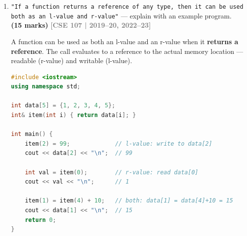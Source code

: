 \documentclass[12pt,a3paper]{article}
\newcommand{\yr}[1]{\hfill\textcolor{gray}{\small\textbf{[#1]}}}
\newcommand{\mk}[1]{\textcolor{orange!70!black}{\small\textbf{(#1 marks)}}}
\begin{document}
\begin{enumerate}
\begin{tcolorbox}
\begin{lstlisting}[language=C++]
#include <iostream>
using namespace std;

void space(char ch)            { cout << ch << "\n"; }
void space(char ch, int count) {
    for (int i = 0; i < count; i++) cout << ch;
    cout << "\n";
}

int main() {
    void (*fp1)(char)      = space;  // first version
    void (*fp2)(char, int) = space;  // second version

    fp1('*');      // *
    fp2('-', 5);   // -----
    return 0;
}
\end{lstlisting}

\textbf{Problem if second declared as
\texttt{void space(char ch, int count = 0)}:}

Both \texttt{space(char)} and \texttt{space(char, int=0)} match a
one-argument call.  When the compiler tries to resolve
\texttt{fp1 = space}, it finds two equally valid matches and reports
an \textbf{ambiguity error}.

\end{tcolorbox}


\item \texttt{"If a function returns a reference of any type, then it can be used both as an l-value and r-value"} --- explain with an example program. \mk{15}
\yr{CSE 107 | 2019--20, 2022--23}

\begin{tcolorbox}[enhanced,breakable,ansbox,colback=cC!4,colframe=cC,
  boxrule=0.8pt,arc=5pt,
  title={\textbf{Answer --- Function as l-value and r-value}},
  fonttitle=\bfseries\color{white},colbacktitle=cC]

A function can be used as both an l-value and an r-value when it
\textbf{returns a reference}.  The call evaluates to a reference to
the actual memory location --- readable (r-value) and writable
(l-value).

\begin{lstlisting}[language=C++]
#include <iostream>
using namespace std;

int data[5] = {1, 2, 3, 4, 5};
int& item(int i) { return data[i]; }

int main() {
    item(2) = 99;             // l-value: write to data[2]
    cout << data[2] << "\n";  // 99

    int val = item(0);        // r-value: read data[0]
    cout << val << "\n";      // 1

    item(1) = item(4) + 10;   // both: data[1] = data[4]+10 = 15
    cout << data[1] << "\n";  // 15
    return 0;
}
\end{lstlisting}


\end{tcolorbox}
\end{enumerate}
\end{document}
